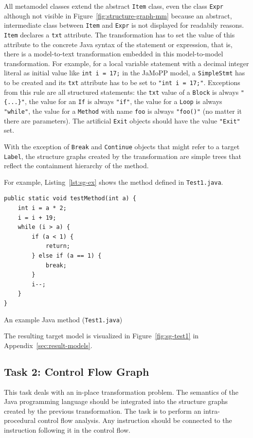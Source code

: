 \documentclass[11pt]{article}
\begin{document}
All metamodel classes extend the abstract \verb|Item| class, even the class
\verb|Expr| although not visible in Figure~\ref{fig:structure-graph-mm} because
an abstract, intermediate class between \verb|Item| and \verb|Expr| is not
displayed for readabily reasons.  \verb|Item| declares a \verb|txt| attribute.
The transformation has to set the value of this attribute to the concrete Java
syntax of the statement or expression, that is, there is a model-to-text
transformation embedded in this model-to-model transformation.  For example,
for a local variable statement with a decimal integer literal as initial value
like \verb|int i = 17;| in the JaMoPP model, a \verb|SimpleStmt| has to be
created and its \verb|txt| attribute has to be set to \verb|"int i = 17;"|.
Exceptions from this rule are all structured statements: the \verb|txt| value
of a \verb|Block| is always \verb|"{...}"|, the value for an \verb|If| is
always \verb|"if"|, the value for a \verb|Loop| is always \verb|"while"|, the
value for a \verb|Method| with name \verb|foo| is always \verb|"foo()"| (no
matter it there are parameters).  The artificial \verb|Exit| objects should
have the value \verb|"Exit"| set.

With the exception of \verb|Break| and \verb|Continue| objects that might refer
to a target \verb|Label|, the structure graphs created by the transformation
are simple trees that reflect the containment hierarchy of the method.

For example, Listing~\ref{lst:sg-ex} shows the method defined in
\verb|Test1.java|.

\begin{listing}
  \begin{verbatim}
public static void testMethod(int a) {
    int i = a * 2;
    i = i + 19;
    while (i > a) {
        if (a < 1) {
            return;
        } else if (a == 1) {
            break;
        }
        i--;
    }
}
  \end{verbatim}
  \caption{An example Java method (\texttt{Test1.java})}
  \label{lst:sg-ex}
\end{listing}

The resulting target model is visualized in Figure~\ref{fig:sg-test1} in
Appendix~\ref{sec:result-models}.


\subsection{Task 2: Control Flow Graph}
\label{sec:task2-cf-graph}

This task deals with an in-place transformation problem.  The semantics of the
Java programming language should be integrated into the structure graphs
created by the previous transformation.  The task is to perform an
intra-procedural control flow analysis.  Any instruction should be connected to
the instruction following it in the control flow.
\end{document}
